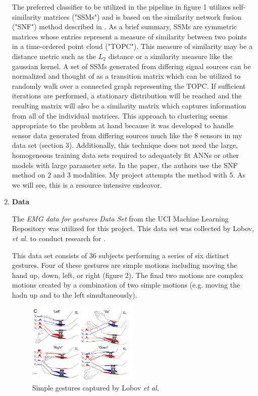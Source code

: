 \documentclass[11pt]{article}
\begin{document}
\begin{enumerate}
The preferred classifier to be utilized in the pipeline in figure 1 utilizes self-similarity matrices ("SSMs") and is based on the similarity network fusion ("SNF") method described in \cite{snf}. As a brief summary, SSMs are symmetric matrices whose entries represent a measure of similarity between two points in a time-ordered point cloud ("TOPC"). This measure of similarity may be a distance metric such as the $L_2$ distance or a similarity measure like the gaussian kernel. A set of SSMs generated from differing signal sources can be normalized and thought of as a transition matrix which can be utilized to randomly walk over a connected graph representing the TOPC. If sufficient iterations are performed, a stationary distribution will be reached and the resulting matrix will also be a similarity matrix which captures information from all of the individual matrices. This approach to clustering seems appropriate to the problem at hand because it was developed to handle sensor data generated from differing sources much like the 8 sensors in my data set (section 3). Additionally, this technique does not need the large, homogeneous training data sets required to adequately fit ANNs or other models with large parameter sets. In the paper, the authors use the SNF method on 2 and 3 modalities. My project attempts the method with 5. As we will see, this is a resource intensive endeavor.

\item \textbf{Data}

The \emph{EMG data for gestures Data Set} from the UCI Machine Learning Repository \cite{uci} was utilized for this project. This data set was collected by Lobov, \emph{et al.} to conduct research for \cite{lobov}.

This data set consists of 36 subjects performing a series of six distinct gestures. Four of these gestures are simple motions including moving the hand up, down, left, or right (figure 2). The final two motions are complex motions created by a combination of two simple motions (e.g. moving the hadn up and to the left simultaneously).

\begin{figure}[h]
\centering
\includegraphics[width=0.5\textwidth]{gests}
\caption{Simple gestures captured by Lobov \emph{et al.} \cite{lobov}}
\end{figure}


\end{enumerate}
\end{document}
